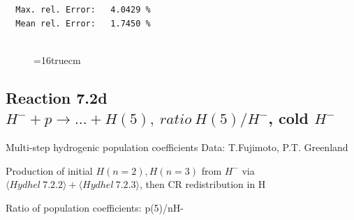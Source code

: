 \documentclass[12pt,dvips]{article}
\begin{document}
\begin{small}
\begin{verbatim}
  Max. rel. Error:   4.0429 %
  Mean rel. Error:   1.7450 %


\end{verbatim}\end{small}
\begin{figure} \label{7.2c}
\epsfxsize=16truecm
\end{figure}
\newpage

\subsection{
Reaction 7.2d $ H^- + p \rightarrow ...+ H(5) , \ ratio ~ H(5)/H^- $, cold $H^-$
}
 Multi-step hydrogenic population coefficients
 Data: T.Fujimoto, P.T. Greenland

Production of initial $H(n=2), H(n=3)$ from $H^-$ via $ \langle Hydhel~ 7.2.2\rangle + \langle Hydhel~ 7.2.3\rangle$,
 then CR redistribution in H

 Ratio of population coefficients: p(5)/nH-
\end{document}
